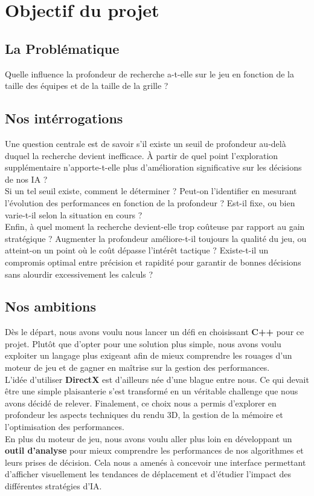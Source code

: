 \section{Objectif du projet}
\subsection{La Problématique}
Quelle influence la profondeur de recherche a-t-elle sur le jeu en fonction de la taille des équipes et de la taille de la grille ?

\subsection{Nos intérrogations}
Une question centrale est de savoir s’il existe un seuil de profondeur au-delà duquel la recherche devient inefficace. À partir de quel point l’exploration supplémentaire n’apporte-t-elle plus d’amélioration significative sur les décisions de nos IA ? \\
Si un tel seuil existe, comment le déterminer ? Peut-on l’identifier en mesurant l’évolution des performances en fonction de la profondeur ? Est-il fixe, ou bien varie-t-il selon la situation en cours  ? \\
Enfin, à quel moment la recherche devient-elle trop coûteuse par rapport au gain stratégique ? Augmenter la profondeur améliore-t-il toujours la qualité du jeu, ou atteint-on un point où le coût dépasse l’intérêt tactique ? Existe-t-il un compromis optimal entre précision et rapidité pour garantir de bonnes décisions sans alourdir excessivement les calculs ?

\subsection{Nos ambitions}
Dès le départ, nous avons voulu nous lancer un défi en choisissant \textbf{C++} pour ce projet. Plutôt que d'opter pour une solution plus simple, nous avons voulu exploiter un langage plus exigeant afin de mieux comprendre les rouages d’un moteur de jeu et de gagner en maîtrise sur la gestion des performances. \\
L'idée d'utiliser \textbf{DirectX} est d’ailleurs née d’une blague entre nous. Ce qui devait être une simple plaisanterie s’est transformé en un véritable challenge que nous avons décidé de relever. Finalement, ce choix nous a permis d'explorer en profondeur les aspects techniques du rendu 3D, la gestion de la mémoire et l'optimisation des performances. \\
En plus du moteur de jeu, nous avons voulu aller plus loin en développant un \textbf{outil d’analyse} pour mieux comprendre les performances de nos algorithmes et leurs prises de décision. Cela nous a amenés à concevoir une interface permettant d'afficher visuellement les tendances de déplacement et d'étudier l’impact des différentes stratégies d’IA. \\
